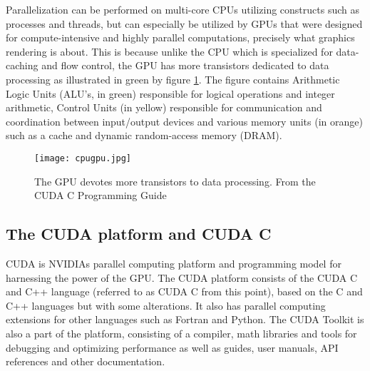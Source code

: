 Parallelization can be performed on multi-core CPUs utilizing constructs such as processes and threads, but can especially be utilized by GPUs that were designed for compute-intensive and highly parallel computations, precisely what graphics rendering is about.
This is because unlike the CPU which is specialized for data-caching and flow control, the GPU has more transistors dedicated to data processing as illustrated in green by figure \ref{cpugpu}. The figure contains Arithmetic Logic Units (ALU's, in green) responsible for logical operations and integer arithmetic, Control Units (in yellow) responsible for communication and coordination between input/output devices and various memory units (in orange) such as a cache and dynamic random-access memory (DRAM).

\begin{figure}[h!]
\texttt{[image: cpugpu.jpg]}
\caption{The GPU devotes more transistors to data processing. From the CUDA C Programming Guide \cite{nvidia2014programming}\label{cpugpu}}
\end{figure}


\subsection{The CUDA platform and CUDA C}
CUDA is NVIDIAs parallel computing platform and programming model for harnessing the power of the GPU.
The CUDA platform consists of the CUDA C and C++ language (referred to as CUDA C from this point), based on the C and C++ languages but with some alterations.
It also has parallel computing extensions for other languages such as Fortran and Python.
The CUDA Toolkit is also a part of the platform, consisting of a compiler, math libraries and tools for debugging and optimizing performance as well as guides, user manuals, API references and other documentation.

